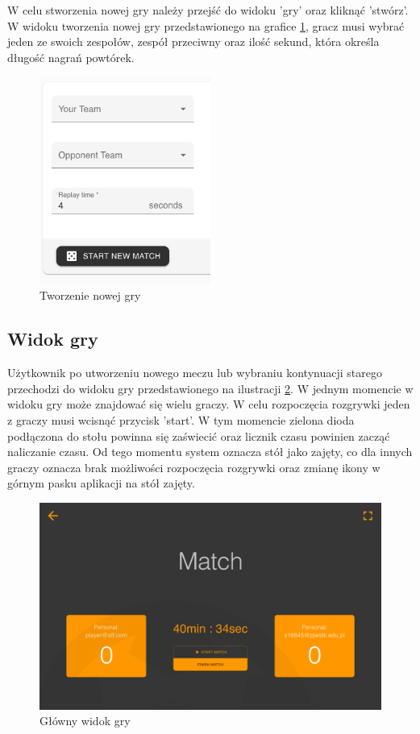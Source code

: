 W celu stworzenia nowej gry należy przejść do widoku 'gry' oraz kliknąć 'stwórz'. W widoku tworzenia nowej gry przedstawionego na grafice \ref{fig:create-match}, gracz musi wybrać jeden ze swoich zespołów, zespół przeciwny oraz ilość sekund, która określa długość nagrań powtórek.

\begin{figure}[h!]
  \centering
    \includegraphics[width=0.5\textwidth]{images/player/create-match.png}
  \caption{Tworzenie nowej gry}
  \label{fig:create-match}
\end{figure}

\subsection{Widok gry}
Użytkownik po utworzeniu nowego meczu lub wybraniu kontynuacji starego przechodzi do widoku gry przedstawionego na ilustracji \ref{fig:match}. W jednym momencie w widoku gry może znajdować się wielu graczy. W celu rozpoczęcia rozgrywki jeden z graczy musi wcisnąć przycisk 'start'. W tym momencie zielona dioda podłączona do stołu powinna się zaświecić oraz licznik czasu powinien zacząć naliczanie czasu. Od tego momentu system oznacza stół jako zajęty, co dla innych graczy oznacza brak możliwości rozpoczęcia rozgrywki oraz zmianę ikony w górnym pasku aplikacji na stół zajęty.

\begin{figure}[h!]
  \centering
    \includegraphics[width=\textwidth]{images/player/match.png}
  \caption{Główny widok gry}
  \label{fig:match}
\end{figure}

